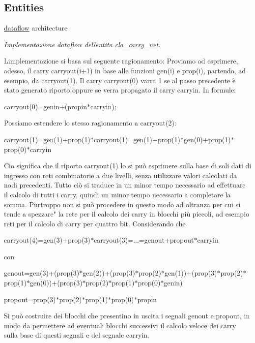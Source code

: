 \subsection*{Entities}
\begin{DoxyCompactItemize}
\item 
\hyperlink{classcla__carry__net_1_1dataflow}{dataflow} architecture
\begin{DoxyCompactList}\small\item\em Implementazione dataflow dell\textquotesingle{}entita\textquotesingle{} \hyperlink{classcla__carry__net}{cla\+\_\+carry\+\_\+net}.

L\textquotesingle{}implementazione si basa sul seguente ragionamento\+: Proviamo ad esprimere, adesso, il carry carryout(i+1) in base alle funzioni gen(i) e prop(i), partendo, ad esempio, da carryout(1). Il carry carryout(0) varra\textquotesingle{} 1 se al passo precedente è stato generato riporto oppure se verra\textquotesingle{} propagato il carry carryin. In formule\+: \begin{center}carryout(0)=genin+(propin$\ast$carryin);\end{center}  Possiamo estendere lo stesso ragionamento a carryout(2)\+: \begin{center}carryout(1)=gen(1)+prop(1)$\ast$carryout(1)=gen(1)+prop(1)$\ast$gen(0)+prop(1)$\ast$prop(0)$\ast$carryin\end{center}  Cio\textquotesingle{} significa che il riporto carryout(1) lo si può esprimere sulla base di soli dati di ingresso con reti combinatorie a due livelli, senza utilizzare valori calcolati da nodi precedenti. Tutto ciò si traduce in un minor tempo necessario ad effettuare il calcolo di tutti i carry, quindi un minor tempo necessario a completare la somma. Purtroppo non si può procedere in questo modo ad oltranza per cui si tende a spezzare" la rete per il calcolo dei carry in blocchi più piccoli, ad esempio reti per il calcolo di carry per quattro bit. Considerando che \begin{center}carryout(4)=gen(3)+prop(3)$\ast$carryout(3)=...=genout+propout$\ast$carryin\end{center}  con \begin{center}genout=gen(3)+(prop(3)$\ast$gen(2))+(prop(3)$\ast$prop(2)$\ast$gen(1))+(prop(3)$\ast$prop(2)$\ast$prop(1)$\ast$gen(0))+(prop(3)$\ast$prop(2)$\ast$prop(1)$\ast$prop(0)$\ast$genin)\end{center}  \begin{center}propout=prop(3)$\ast$prop(2)$\ast$prop(1)$\ast$prop(0)$\ast$propin\end{center}  Si può costruire dei blocchi che presentino in uscita i segnali genout e propout, in modo da permettere ad eventuali blocchi successivi il calcolo veloce dei carry sulla base di questi segnali e del segnale carryin. \end{DoxyCompactList}\end{DoxyCompactItemize}
